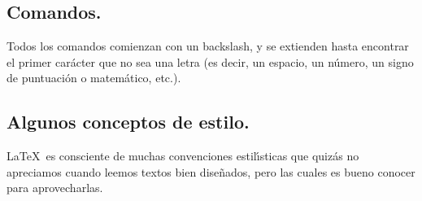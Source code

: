 \subsection{Comandos.}

Todos los comandos comienzan con un backslash, y se extienden hasta
encontrar el primer car{\'a}cter que no sea una letra (es decir, un
espacio, un n{\'u}mero, un signo de puntuaci{\'o}n o matem{\'a}tico, etc.).

\subsection{Algunos conceptos de estilo.}

\LaTeX\ es consciente de muchas convenciones estil{\'\i}sticas que quiz{\'a}s
no apreciamos cuando leemos textos bien dise{\~n}ados, pero las cuales es
bueno conocer para aprovecharlas.

